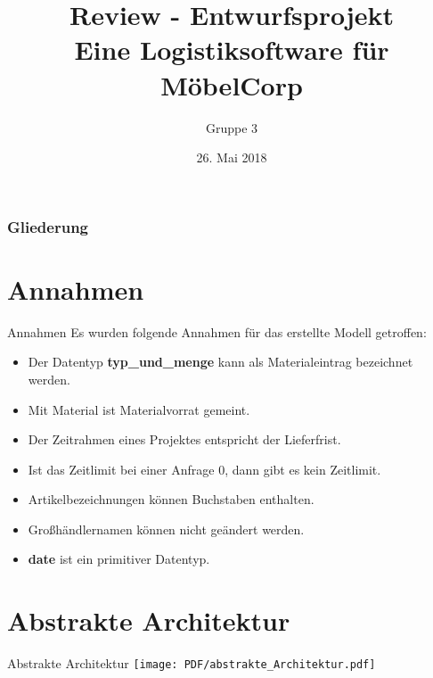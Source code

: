 \documentclass{beamer}
\begin{document}
			
	
	\title[Review - Entwurfsprojekt]{Review - Entwurfsprojekt\\ Eine Logistiksoftware für MöbelCorp}
	\author{Gruppe 3}
	
	 \begin{frame}[title=Hauptgebaeude_Nacht.jpg]
	 	\maketitle
	 	\date{26. Mai 2018}
 	\end{frame}
	 
	\begin{frame}
		\frametitle{Gliederung}
		\tableofcontents
	\end{frame}
	\section*{Annahmen}
	\begin{frame}{Annahmen}
	Es wurden folgende Annahmen für das erstellte Modell getroffen:
	\begin{itemize}
		\item Der Datentyp \textbf{typ\_und\_menge} kann als Materialeintrag bezeichnet werden.
		\item Mit Material ist Materialvorrat gemeint.
		\item Der Zeitrahmen eines Projektes entspricht der Lieferfrist.
		\item Ist das Zeitlimit bei einer Anfrage 0, dann gibt es kein Zeitlimit.
		\item Artikelbezeichnungen können Buchstaben enthalten.
		\item Großhändlernamen können nicht geändert werden.
		\item \textbf{date} ist ein primitiver Datentyp.
	\end{itemize}
	\end{frame}
	\section{Abstrakte Architektur}
	\begin{frame}{Abstrakte Architektur}
		\texttt{[image: PDF/abstrakte\_Architektur.pdf]}
	\end{frame}
\end{document}
